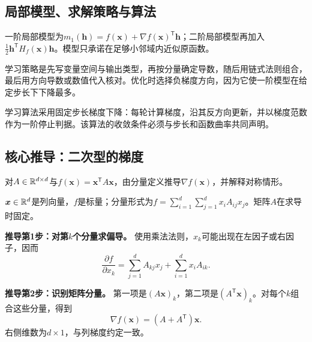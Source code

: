 \subsection*{局部模型、求解策略与算法}
\label{schema:V1-C03:CH-08}
一阶局部模型为$m_1(\boldsymbol h)=f(\boldsymbol x)+\nabla f(\boldsymbol x)^{\mathsf T}\boldsymbol h$；二阶局部模型再加入$\frac12\boldsymbol h^{\mathsf T}H_f(\boldsymbol x)\boldsymbol h$。模型只承诺在足够小邻域内近似原函数。

\label{schema:V1-C03:CH-09}
学习策略是先写变量空间与输出类型，再按分量确定导数，随后用链式法则组合，最后用方向导数或数值代入核对。优化时选择负梯度方向，因为它使一阶模型在给定步长下下降最多。

\label{schema:V1-C03:CH-10}
学习算法采用固定步长梯度下降：每轮计算梯度，沿其反方向更新，并以梯度范数作为一阶停止判据。该算法的收敛条件必须与步长和函数曲率共同声明。

\subsection*{核心推导：二次型的梯度}

\begin{derivationgoalbox}\label{schema:V1-C03:CH-11}
对$A\in\mathbb{R}^{d\times d}$与$f(\boldsymbol{x})=\boldsymbol{x}^{\mathsf T}A\boldsymbol{x}$，由分量定义推导$\nabla f(\boldsymbol{x})$，并解释对称情形。
\end{derivationgoalbox}
\begin{derivationprepbox}
$\boldsymbol{x}\in\mathbb{R}^d$是列向量，$f$是标量；分量形式为$f=\sum_{i=1}^{d}\sum_{j=1}^{d}x_iA_{ij}x_j$。矩阵$A$在求导时固定。
\end{derivationprepbox}
\textbf{推导第1步：对第$k$个分量求偏导。} 使用乘法法则，$x_k$可能出现在左因子或右因子，因而
\[
\frac{\partial f}{\partial x_k}
=\sum_{j=1}^{d}A_{kj}x_j+\sum_{i=1}^{d}x_iA_{ik}.
\]

\textbf{推导第2步：识别矩阵分量。} 第一项是$(A\boldsymbol{x})_k$，第二项是$(A^{\mathsf T}\boldsymbol{x})_k$。对每个$k$组合这些分量，得到
\[
\nabla f(\boldsymbol{x})=(A+A^{\mathsf T})\boldsymbol{x}.
\]
右侧维数为$d\times1$，与列梯度约定一致。

